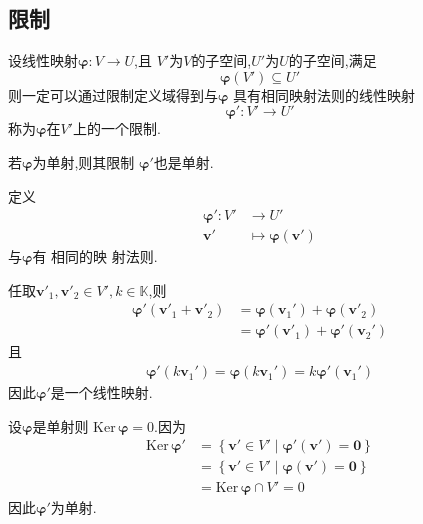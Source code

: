 \subsection{限制}
\begin{formal}
\begin{definition}[限制]\label{def:限制}
    设线性映射$\bm{\varphi}:V\longrightarrow U$,且
    $V'$为$V$的子空间,$U'$为$U$的子空间,满足
    \[
    \bm{\varphi}\left(V'\right)\subseteq U'
    \]
    则一定可以通过限制定义域得到与$\bm{\varphi}$
    具有相同映射法则的线性映射
    \[
    \bm{\varphi}':V'\longrightarrow U'
    \]
    称为$\bm{\varphi}$在$V'$上的一个限制.
\end{definition}
\end{formal}
\begin{green}
    \begin{lemma}[限制单射的继承]\label{lemma:限制单射的继承}
        若$\bm{\varphi}$为单射,则其限制
        $\bm{\varphi}'$也是单射.
    \end{lemma}
    \begin{Proof}
    定义\begin{align*}
        \bm{\varphi}':V'&\longrightarrow U'\\
        \bm{v}'&\longmapsto \bm{\varphi}\left(\bm{v}'\right)
    \end{align*}
    与$\bm{\varphi}$有
    相同的映
    射法则.

    任取$\bm{v}'_1,\bm{v}'_2\in V',k\in \mathbb{K}$,则
    \begin{align*}
        \bm{\varphi}'\left(\bm{v}'_1+\bm{v}'_2\right)&=\bm{\varphi}\left(\bm{v}_1'\right)+\bm{\varphi}\left(\bm{v}'_2\right)\\
&=\bm{\varphi}'\left(\bm{v}'_1\right)+\bm{\varphi}'\left(\bm{v}_2'\right)
    \end{align*}
    且
    \begin{align*}
        \bm{\varphi}'\left(k\bm{v}_1'\right)=\bm{\varphi}\left(k\bm{v}_1'\right)=k\bm{\varphi}'\left(\bm{v}_1'\right)
    \end{align*}
    因此$\bm{\varphi}'$是一个线性映射.

    设$\bm{\varphi}$是单射则
    $\mathrm{Ker}\,\bm{\varphi}=0.$因为
\begin{align*}
    \mathrm{Ker}\,\bm{\varphi}'&=\left\{\bm{v}'\in V'\mid\bm{\varphi}'\left(\bm{v}'\right)=\bm{0}\right\}\\
    &=\left\{\bm{v}'\in V'\mid\bm{\varphi}\left(\bm{v}'\right)=\bm{0}\right\}\\
    &=\mathrm{Ker}\,\bm{\varphi}\cap V'=0
\end{align*}
因此$\bm{\varphi}'$为单射.
    \end{Proof}
\end{green}
